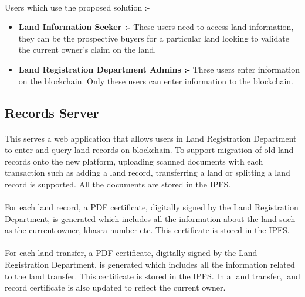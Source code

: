 \documentclass{article}
\begin{document}
    \paragraph{}
    Users which use the proposed solution :-
    \begin{itemize}
        \item \textbf{Land Information Seeker :-} These users need to access land information, they can be the prospective buyers for a particular land looking to validate the current owner's claim on the land.
        \item \textbf{Land Registration Department Admins :-} These users enter information on the blockchain. Only these users can enter information to the blockchain.
    \end{itemize}

    \subsection{Records Server}
        \paragraph{}
        This serves a web application that allows users in Land Registration Department to enter and query land records on blockchain. To support migration of old land records onto the new platform, uploading scanned documents with each transaction such as adding a land record, transferring a land or splitting a land record is supported. All the documents are stored in the IPFS.

        \paragraph{}
        For each land record, a PDF certificate, digitally signed by the Land Registration Department, is generated which includes all the information about the land such as the current owner, khasra number etc. This certificate is stored in the IPFS.
        
        \paragraph{}
        For each land transfer, a PDF certificate, digitally signed by the Land Registration Department, is generated which includes all the information related to the land transfer. This certificate is stored in the IPFS. In a land transfer, land record certificate is also updated to reflect the current owner.
\end{document}
